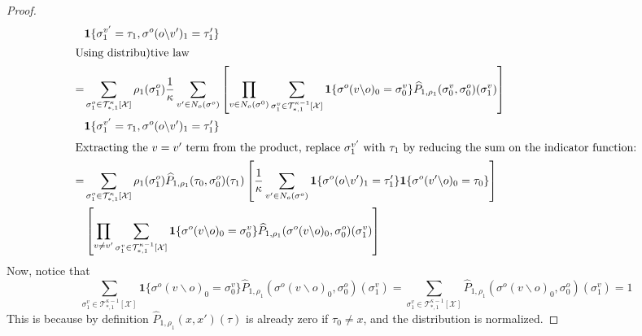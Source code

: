 \documentclass[12pt]{article}
\newcommand{\one}[1]{\mathbf{1}\{#1\}}
\newcommand{\tree}[2]{\mathcal{T}_{*, #1}^{#2}[\mathcal{X}]}
\numberwithin{equation}{section}
\begin{document}
\begin{proof}
\begin{align*}
          & \one{\sigma^{v'}_1 = \tau_1, \sigma^o(o\backslash v')_1 = \tau_1'}                                                                                                                                                                                                                                                                       \\
        \intertext{Using distribu)tive law}
        = & \sum_{\sigma_1^o\in \tree{1}{\kappa}} \rho_1(\sigma^o_1)  \frac1\kappa \sum_{v'\in N_o(\sigma^o)}\left[\prod_{v\in N_o(\sigma^0)}\sum_{\sigma_1^v\in \tree{1}{\kappa-1}}\one{\sigma^o(v\backslash o)_0 = \sigma^v_0}\widehat{P}_{1, \rho_1}(\sigma^v_0, \sigma^o_0)(\sigma^v_1)\right]                                                   \\
          & \one{\sigma^{v'}_1 = \tau_1, \sigma^o(o\backslash v')_1 = \tau_1'}                                                                                                                                                                                                                                                                       \\
        \intertext{Extracting the $v=v'$ term from the product, replace $\sigma^{v'}_1$ with $\tau_1$ by reducing the sum on the indicator function:}
        = & \sum_{\sigma_1^o\in \tree{1}{\kappa}} \rho_1(\sigma^o_1)\widehat{P}_{1, \rho_1}(\tau_0, \sigma^o_0)(\tau_1) \left[\frac1\kappa \sum_{v'\in N_o(\sigma^o)}\one{\sigma^o(o\backslash v')_1 = \tau_1'}\one{\sigma^o(v'\backslash o)_0 = \tau_0}\right]                                                                                      \\
          & \left[\prod_{v \neq v'}\sum_{\sigma_1^v\in \tree{1}{\kappa-1}}\one{\sigma^o(v\backslash o)_0 = \sigma^v_0}\widehat{P}_{1, \rho_1}(\sigma^o(v\backslash o)_0, \sigma^o_0)(\sigma^v_1)\right]                                                                                                                                              \\
    \end{align*}
    Now, notice that
    \begin{equation*}
        \sum_{\sigma_1^v\in \tree{1}{\kappa-1}}\one{\sigma^o(v\backslash o)_0 = \sigma^v_0}\widehat{P}_{1, \rho_1}(\sigma^o(v\backslash o)_0, \sigma^o_0)(\sigma^v_1)
        = \sum_{\sigma_1^v\in \tree{1}{\kappa-1}}\widehat{P}_{1, \rho_1}(\sigma^o(v\backslash o)_0, \sigma^o_0)(\sigma^v_1) = 1
    \end{equation*}
    This is because by definition $\widehat{P}_{1, \rho_1}(x, x')(\tau)$ is already zero if $\tau_0 \neq x$, and the distribution is normalized.


\end{proof}
\end{document}
